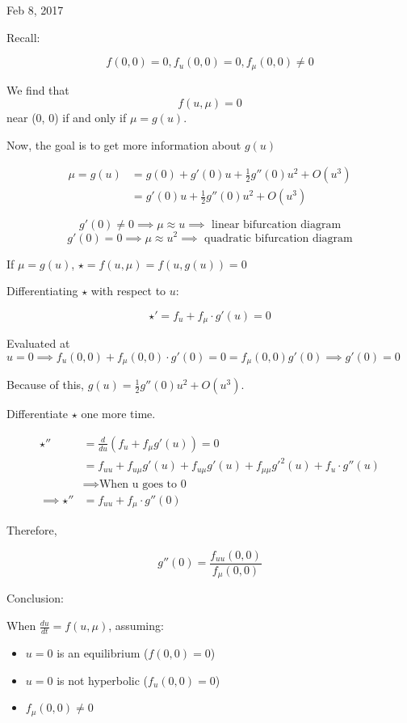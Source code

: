 \documentclass[main.tex]{subfiles}
\begin{document}
\hrulefill{}

Feb 8, 2017

\vspace{3mm}

Recall:

$$f(0, 0) = 0, f_u (0, 0) = 0, f_\mu (0, 0) \neq 0$$

We find that $$f(u, \mu)=0$$ near (0, 0) if and only if $\mu = g(u)$.

Now, the goal is to get more information about $g(u)$

\begin{align}
\mu = g(u) &= g(0) + g'(0)u + \frac{1}{2}g''(0)u^2 + O(u^3) \\
           &= g'(0)u + \frac{1}{2}g''(0)u^2 + O(u^3)
\end{align}

$$g'(0) \neq 0 \implies \mu \approx u \implies \textrm{ linear bifurcation diagram}$$
$$g'(0) = 0 \implies \mu \approx u^2 \implies \textrm{ quadratic bifurcation diagram}$$

If $\mu = g(u)$, $\star = f(u, \mu) = f(u, g(u)) = 0$

Differentiating $\star$ with respect to $u$:

$$\star' = f_u + f_\mu\cdot g'(u) = 0$$

Evaluated at $u = 0 \implies f_u(0, 0) + f_\mu(0, 0)\cdot g'(0) = 0 = f_\mu(0, 0)g'(0)\implies g'(0) = 0$

Because of this,  $g(u) = \frac{1}{2} g''(0)u^2 + O(u^3)$.

Differentiate $\star$ one more time.

\begin{align}
\star'' &= \frac{d}{du}(f_u + f_\mu g'(u)) = 0 \\
        &= f_{uu} + f_{u\mu}g'(u) + f_{u\mu}g'(u) + f_{\mu\mu}g'^2(u) + f_u\cdot g''(u) \\
        &\implies \textrm{When u goes to 0} \\
\implies \star'' &= f_{uu} + f_\mu\cdot g''(0)
\end{align}

Therefore,

$$g''(0) = \frac{f_{uu}(0, 0)}{f_\mu (0, 0)}$$

Conclusion:

When $\frac{du}{dt} = f(u, \mu)$, assuming:
\begin{itemize}
    \item $u = 0$ is an equilibrium ($f(0, 0) = 0$)
    \item $u = 0$ is not hyperbolic ($f_u(0, 0) = 0$)
    \item $f_\mu(0, 0) \neq 0$
\end{itemize}
\end{document}
